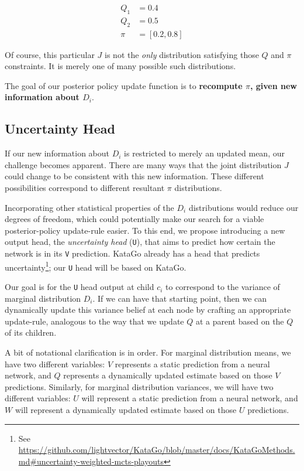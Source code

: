 \documentclass[tikz]{article}
\begin{document}
\begin{align*}
Q_1 &= 0.4 \\
Q_2 &= 0.5 \\
\pi &= [0.2, 0.8]
\end{align*}

Of course, this particular $J$ is not the \emph{only} distribution satisfying those $Q$ and $\pi$ constraints. It is merely one of
many possible such distributions. \newline

The goal of our posterior policy update function is to \textbf{recompute $\pi$, given new information about $D_i$}.

\subsection{Uncertainty Head}

If our new information about $D_i$ is restricted to merely an updated mean, our challenge becomes apparent. There are many ways that the joint 
distribution $J$ could change to be consistent with this new information. These different possibilities correspond to different
resultant $\pi$ distributions. \newline

Incorporating other statistical properties of the $D_i$ distributions would reduce our degrees of freedom, which could potentially
make our search for a viable posterior-policy update-rule easier. To this end, we propose introducing a new output head, the \emph{uncertainty head} (\texttt{U}),
that aims to predict how certain the network is in its \texttt{V} prediction. KataGo already has a head that predicts uncertainty\footnote{See \url{https://github.com/lightvector/KataGo/blob/master/docs/KataGoMethods.md\#uncertainty-weighted-mcts-playouts}}; our \texttt{U} head will
be based on KataGo. \newline

Our goal is for the \texttt{U} head output at child $c_i$ to correspond to the variance of marginal distribution $D_i$. If we can have
that starting point, then we can dynamically update this variance belief at each node by crafting an appropriate update-rule, analogous
to the way that we update $Q$ at a parent based on the $Q$ of its children. \newline

A bit of notational clarification is in order. For marginal distribution means, we have two different variables: $V$ represents a static prediction
from a neural network, and $Q$ represents a dynamically updated estimate based on those $V$ predictions. Similarly, for marginal distribution
variances, we will have two different variables: $U$ will represent a static prediction from a neural network, and $W$ will represent
a dynamically updated estimate based on those $U$ predictions. \newline
\end{document}
